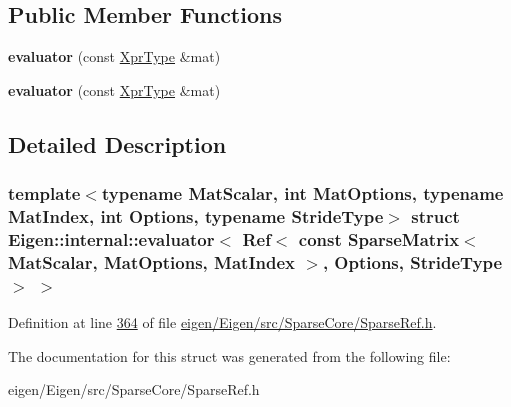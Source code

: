 \subsection*{Public Member Functions}
\begin{DoxyCompactItemize}
\item 
\mbox{\label{struct_eigen_1_1internal_1_1evaluator_3_01_ref_3_01const_01_sparse_matrix_3_01_mat_scalar_00_01_17d98bf798af280639e961c8a27d545c_a2be495809edfd3a900007c5d5b6ad7c5}} 
{\bfseries evaluator} (const \hyperlink{class_eigen_1_1_ref_3_01const_01_sparse_matrix_3_01_mat_scalar_00_01_mat_options_00_01_mat_index1bbfd78857ba9c14d54178cb3009ac38}{Xpr\+Type} \&mat)
\item 
\mbox{\label{struct_eigen_1_1internal_1_1evaluator_3_01_ref_3_01const_01_sparse_matrix_3_01_mat_scalar_00_01_17d98bf798af280639e961c8a27d545c_a2be495809edfd3a900007c5d5b6ad7c5}} 
{\bfseries evaluator} (const \hyperlink{class_eigen_1_1_ref_3_01const_01_sparse_matrix_3_01_mat_scalar_00_01_mat_options_00_01_mat_index1bbfd78857ba9c14d54178cb3009ac38}{Xpr\+Type} \&mat)
\end{DoxyCompactItemize}


\subsection{Detailed Description}
\subsubsection*{template$<$typename Mat\+Scalar, int Mat\+Options, typename Mat\+Index, int Options, typename Stride\+Type$>$\newline
struct Eigen\+::internal\+::evaluator$<$ Ref$<$ const Sparse\+Matrix$<$ Mat\+Scalar, Mat\+Options, Mat\+Index $>$, Options, Stride\+Type $>$ $>$}



Definition at line \hyperlink{eigen_2_eigen_2src_2_sparse_core_2_sparse_ref_8h_source_l00364}{364} of file \hyperlink{eigen_2_eigen_2src_2_sparse_core_2_sparse_ref_8h_source}{eigen/\+Eigen/src/\+Sparse\+Core/\+Sparse\+Ref.\+h}.



The documentation for this struct was generated from the following file\+:\begin{DoxyCompactItemize}
\item 
eigen/\+Eigen/src/\+Sparse\+Core/\+Sparse\+Ref.\+h\end{DoxyCompactItemize}

